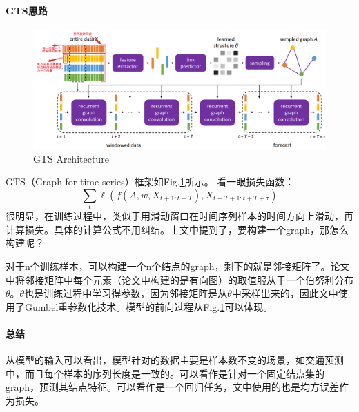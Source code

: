 \paragraph{GTS思路}
\begin{figure}[h]
	\centering
	\includegraphics[width=.9\textwidth]{pics/gts.png}
	\caption{GTS Architecture}
	\label{fig:gts}
\end{figure}
GTS（Graph for time series）框架如Fig.\ref{fig:gts}所示。
看一眼损失函数：
$$
\sum_{t} \ell\left(f\left(A, w, X_{t+1: t+T}\right), X_{t+T+1: t+T+\tau}\right)
$$
很明显，在训练过程中，类似于用滑动窗口在时间序列样本的时间方向上滑动，再计算损失。具体的计算公式不用纠结。上文中提到了，要构建一个graph，那怎么构建呢？

对于n个训练样本，可以构建一个n个结点的graph，剩下的就是邻接矩阵了。论文中将邻接矩阵中每个元素（论文中构建的是有向图）的取值服从于一个伯努利分布$\theta$。$\theta$也是训练过程中学习得参数，因为邻接矩阵是从$\theta$中采样出来的，因此文中使用了Gumbel\cite{jang2017categorical}重参数化技术。模型的前向过程从Fig.\ref{fig:gts}可以体现。

\paragraph{总结}
从模型的输入可以看出，模型针对的数据主要是样本数不变的场景，如交通预测中，而且每个样本的序列长度是一致的。可以看作是针对一个固定结点集的graph，预测其结点特征。可以看作是一个回归任务，文中使用的也是均方误差作为损失。

